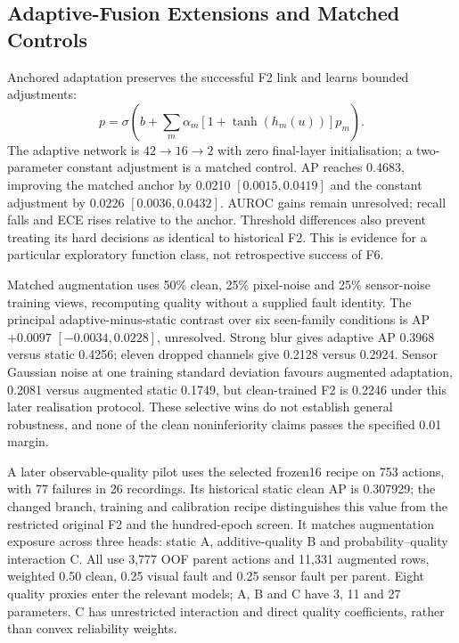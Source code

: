 \subsection{Adaptive-Fusion Extensions and Matched Controls}
Anchored adaptation preserves the successful F2 link and learns bounded adjustments:
\begin{equation}p=\sigma\!\left(b+\sum_m \alpha_m[1+\tanh(h_m(u))]p_m\right).\end{equation}
The adaptive network is $42\rightarrow16\rightarrow2$ with zero final-layer
initialisation; a two-parameter constant adjustment is a matched control. AP reaches
0.4683, improving the matched anchor by 0.0210 $[0.0015, 0.0419]$ and the constant
adjustment by 0.0226 $[0.0036, 0.0432]$. AUROC gains remain unresolved; recall falls and
ECE rises relative to the anchor. Threshold differences also prevent treating its hard
decisions as identical to historical F2. This is evidence for a particular exploratory
function class, not retrospective success of F6.

Matched augmentation uses 50\% clean, 25\% pixel-noise and 25\% sensor-noise training
views, recomputing quality without a supplied fault identity. The principal
adaptive-minus-static contrast over six seen-family conditions is AP $+0.0097$
$[-0.0034, 0.0228]$, unresolved. Strong blur gives adaptive AP 0.3968 versus static 0.4256;
eleven dropped channels give 0.2128 versus 0.2924. Sensor Gaussian noise at one training
standard deviation favours augmented adaptation, 0.2081 versus augmented static 0.1749,
but clean-trained F2 is 0.2246 under this later realisation protocol. These selective
wins do not establish general robustness, and none of the clean noninferiority claims
passes the specified 0.01 margin.

A later observable-quality pilot uses the selected frozen16 recipe on 753 actions, with
77 failures in 26 recordings. Its historical static clean AP is 0.307929; the changed
branch, training and calibration recipe distinguishes this value from the restricted
original F2 and the hundred-epoch screen. It matches augmentation exposure across three
heads: static A, additive-quality B and probability--quality interaction C. All use
3,777 OOF parent actions and 11,331 augmented rows, weighted 0.50 clean, 0.25 visual
fault and 0.25 sensor fault per parent. Eight quality proxies enter the relevant models;
A, B and C have 3, 11 and 27 parameters. C has unrestricted interaction and direct
quality coefficients, rather than convex reliability weights.

